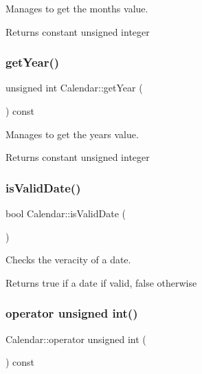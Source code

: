 Manages to get the month\textquotesingle{}s value. 

\begin{DoxyReturn}{Returns}
constant unsigned integer 
\end{DoxyReturn}
\mbox{\label{class_calendar_aae56d627c0f61f70fdae96e816152bd7}} 
\subsubsection{\texorpdfstring{get\+Year()}{getYear()}}
{\footnotesize\ttfamily unsigned int Calendar\+::get\+Year (\begin{DoxyParamCaption}{ }\end{DoxyParamCaption}) const}



Manages to get the year\textquotesingle{}s value. 

\begin{DoxyReturn}{Returns}
constant unsigned integer 
\end{DoxyReturn}
\mbox{\label{class_calendar_a5b30c644c6a7bf69c541c14fc7c4e47d}} 
\subsubsection{\texorpdfstring{is\+Valid\+Date()}{isValidDate()}}
{\footnotesize\ttfamily bool Calendar\+::is\+Valid\+Date (\begin{DoxyParamCaption}{ }\end{DoxyParamCaption})}



Checks the veracity of a date. 

\begin{DoxyReturn}{Returns}
true if a date if valid, false otherwise 
\end{DoxyReturn}
\mbox{\label{class_calendar_a70f6e6b4f62dcca5c05bd9341d288b0a}} 
\subsubsection{\texorpdfstring{operator unsigned int()}{operator unsigned int()}}
{\footnotesize\ttfamily Calendar\+::operator unsigned int (\begin{DoxyParamCaption}{ }\end{DoxyParamCaption}) const}



